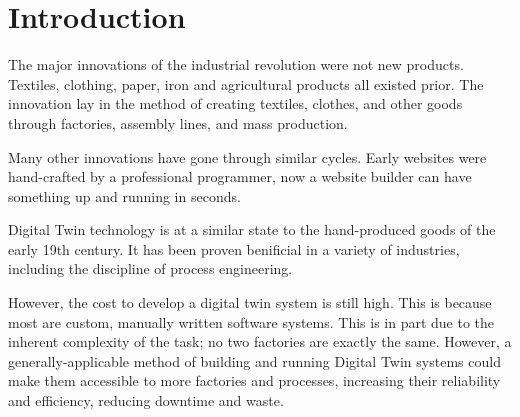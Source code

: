 \chapter{Introduction}

The major innovations of the industrial revolution were not new products. Textiles, clothing, paper, iron and agricultural products all existed prior. The innovation lay in the method of creating textiles, clothes, and other goods through factories, assembly lines, and mass production.

Many other innovations have gone through similar cycles. Early websites were hand-crafted by a professional programmer, now a website builder can have something up and running in seconds.

Digital Twin technology is at a similar state to the hand-produced goods of the early 19th century. It has been proven benificial in a variety of industries, including the discipline of process engineering. 

However, the cost to develop a digital twin system is still high. This is because most are custom, manually written software systems. This is in part due to the inherent complexity of the task; no two factories are exactly the same. However, a generally-applicable method of building and running Digital Twin systems could make them accessible to more factories and processes, increasing their reliability and efficiency, reducing downtime and waste.
